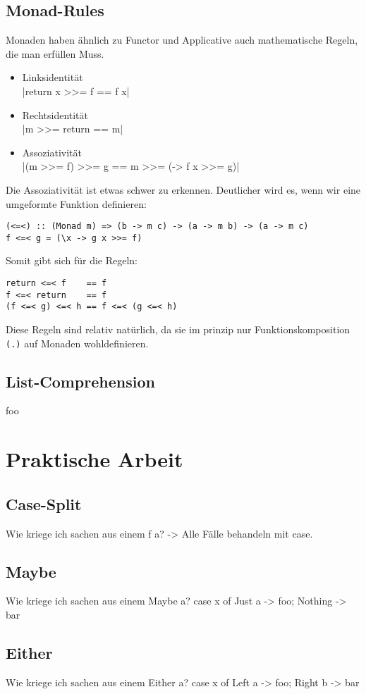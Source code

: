 \documentclass{beamer}
\begin{document}
\subsection{Monad-Rules}
\begin{frame}[fragile]
Monaden haben ähnlich zu Functor und Applicative auch mathematische Regeln, die man erfüllen Muss.\\
\begin{itemize}
 \item Linksidentität\\
       |return x >>= f == f x|
 \item Rechtsidentität\\
       |m >>= return == m|
 \item Assoziativität\\
       |(m >>= f) >>= g == m >>= (\x -> f x >>= g)|
\end{itemize}
\pause
Die Assoziativität ist etwas schwer zu erkennen. Deutlicher wird es, wenn wir eine umgeformte Funktion definieren:
\begin{verbatim}
(<=<) :: (Monad m) => (b -> m c) -> (a -> m b) -> (a -> m c)
f <=< g = (\x -> g x >>= f)
\end{verbatim}
\end{frame}

\begin{frame}[fragile]
Somit gibt sich für die Regeln:
\begin{verbatim}
return <=< f    == f
f <=< return    == f
(f <=< g) <=< h == f <=< (g <=< h)
\end{verbatim}
\pause
Diese Regeln sind relativ \glqq natürlich\grqq , da sie im prinzip nur Funktionskomposition \texttt{(.)} auf Monaden wohldefinieren.
\end{frame}

\subsection{List-Comprehension}
\begin{frame}
 foo
\end{frame}

\section{Praktische Arbeit}

\subsection{Case-Split}
\begin{frame}
 Wie kriege ich sachen aus einem f a? -> Alle Fälle behandeln mit case.
\end{frame}
\subsection{Maybe}
\begin{frame}
 Wie kriege ich sachen aus einem Maybe a? case x of Just a -> foo; Nothing -> bar
\end{frame}
\subsection{Either}
\begin{frame}
 Wie kriege ich sachen aus einem Either a? case x of Left a -> foo; Right b -> bar
\end{frame}
\end{document}
